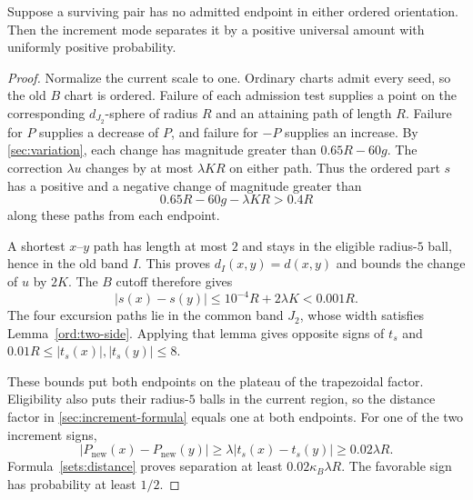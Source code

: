 \begin{lemma}\label{sec:remaining}
Suppose a surviving pair has no admitted endpoint in either ordered
orientation. Then the increment mode separates it by a positive universal
amount with uniformly positive probability.
\end{lemma}
\begin{proof}
Normalize the current scale to one. Ordinary charts admit every seed,
so the old $B$ chart is ordered. Failure of each admission test supplies
a point on the corresponding $d_{J_2}$-sphere of radius $R$ and an
attaining path of length $R$. Failure for $P$ supplies a decrease of
$P$, and failure for $-P$ supplies an increase. By
\eqref{sec:variation}, each change has magnitude greater than
$0.65R-60g$. The correction $\lambda u$ changes by at most
$\lambda KR$ on either path. Thus the ordered part $s$ has a positive
and a negative change of magnitude greater than
\[
 0.65R-60g-\lambda KR>0.4R
\]
along these paths from each endpoint.

A shortest $x$--$y$ path has length at most $2$ and stays in the eligible
radius-$5$ ball, hence in the old band $I$. This proves
$d_I(x,y)=d(x,y)$ and bounds the change of $u$ by $2K$. The $B$ cutoff
therefore gives
\[
 |s(x)-s(y)|\le10^{-4}R+2\lambda K<0.001R.
\]
The four excursion paths lie in the common band $J_2$, whose width
satisfies Lemma~\ref{ord:two-side}. Applying that lemma gives opposite
signs of $t_s$ and $0.01R\le |t_s(x)|,|t_s(y)|\le8$.

These bounds put both endpoints on the plateau of the trapezoidal
factor. Eligibility also puts their radius-$5$ balls in the current
region, so the distance factor in \eqref{sec:increment-formula} equals
one at both endpoints. For one of the two increment signs,
\[
 |P_{\mathrm{new}}(x)-P_{\mathrm{new}}(y)|
   \ge \lambda|t_s(x)-t_s(y)|\ge0.02\lambda R.
\]
Formula~\eqref{sets:distance} proves separation at least
$0.02\kappa_B\lambda R$. The favorable sign has probability at least
$1/2$.
\end{proof}

